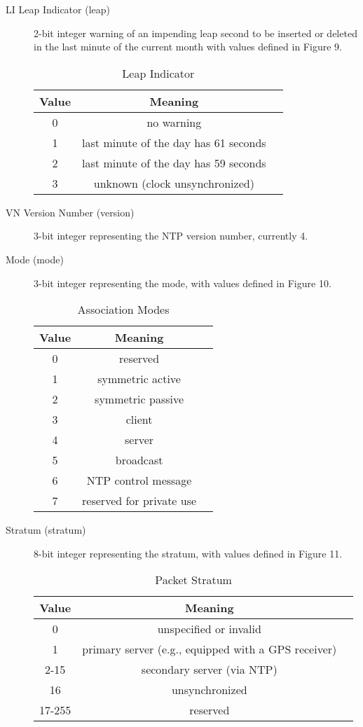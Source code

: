 \begin{description}

\item[LI Leap Indicator (leap)] 2-bit integer warning of an impending leap
second to be inserted or deleted in the last minute of the current
month with values defined in Figure 9.

\begin{table}[htb]
\center
\begin{tabular}{c | c | c}
Value & Meaning \\
\hline
\hline
0 & no warning \\
1 & last minute of the day has 61 seconds \\
2 & last minute of the day has 59 seconds \\
3 & unknown (clock unsynchronized) \\
\hline
\end{tabular}
\label{leap_indicator}
\caption{Leap Indicator}
\end{table}

\item[VN Version Number (version)] 3-bit integer representing the NTP
version number, currently 4.

\item[Mode (mode)] 3-bit integer representing the mode, with values defined
in Figure 10.

\begin{table}[htb]
\center
\begin{tabular}{c | c | c}
Value & Meaning \\
\hline
\hline
0 & reserved \\
1 & symmetric active \\
2 & symmetric passive \\
3 & client \\
4 & server \\
5 & broadcast \\
6 & NTP control message \\
7 & reserved for private use \\
\hline
\end{tabular}
\label{association_modes}
\caption{Association Modes}
\end{table}

\item[Stratum (stratum)] 8-bit integer representing the stratum, with
values defined in Figure 11.

\begin{table}[htb]
\center
\begin{tabular}{c | c | c}
Value & Meaning \\
\hline
\hline
0 & unspecified or invalid \\
1 & primary server (e.g., equipped with a GPS receiver) \\
2-15 & secondary server (via NTP) \\
16 & unsynchronized \\
17-255 & reserved \\
\hline
\end{tabular}
\label{packet_stratum}
\caption{Packet Stratum}
\end{table}


\end{description}
